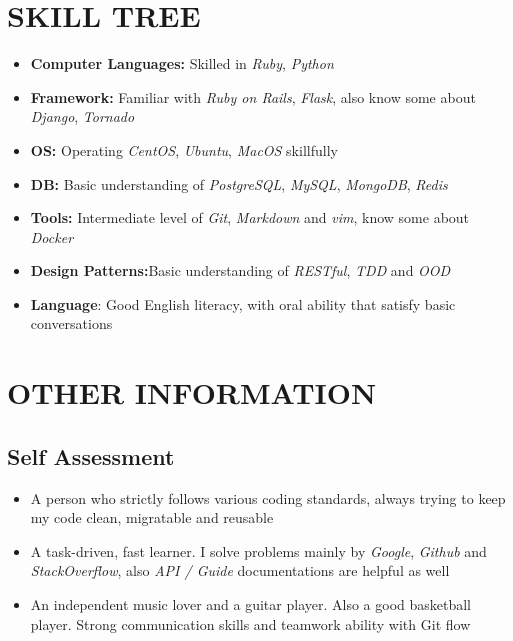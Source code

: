 \documentclass[12pt, a4paper,sans]{moderncv}     %
\begin{document}
\begin{itemize}
\section{SKILL TREE}
    \begin{itemize}
        \item{\textbf{Computer Languages:} {Skilled in \textit{Ruby}, \textit{Python}}}%
        \item{\textbf{Framework:} {Familiar with \textit{Ruby on Rails}, \textit{Flask}, also know some about \textit{Django}, \textit{Tornado}}}%
        \item{\textbf{OS:} {Operating \textit{CentOS}, \textit{Ubuntu}, \textit{MacOS} skillfully}}%
        \item{\textbf{DB:} {Basic understanding of \textit{PostgreSQL}, \textit{MySQL}, \textit{MongoDB}, \textit{Redis}}}%
        \item{\textbf{Tools:} {Intermediate level of \textit{Git}, \textit{Markdown} and \textit{vim}, know some about \textit{Docker}}}%
        \item{\textbf{Design Patterns:}{Basic understanding of \textit{RESTful}, \textit{TDD} and \textit{OOD}}}%
        \item{\textbf{Language}: {Good English literacy, with oral ability that satisfy basic conversations} }
    \end{itemize}

\vspace{0pt}
\section{OTHER INFORMATION}

\subsection{Self Assessment}

    \begin{itemize}
        \item{\medium A person who strictly follows various coding standards, always trying to keep my code clean, migratable and reusable}
        \item{\medium A task-driven, fast learner. I solve problems mainly by \textit{Google}, \textit{Github} and \textit{StackOverflow}, also \textit{API / Guide} documentations are helpful as well}
        \item{\medium An independent music lover and a guitar player. Also a good basketball player. Strong communication skills and teamwork ability with Git flow}
    \end{itemize}
\end{itemize}


\end{document}
